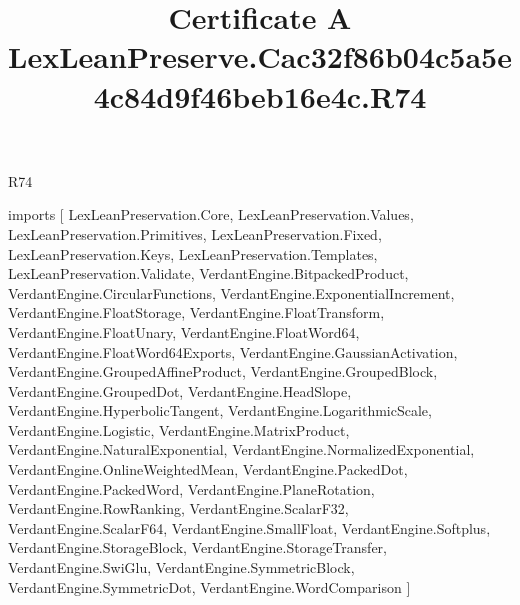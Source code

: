 \begin{lexlean}{R74}
\title{Certificate A LexLeanPreserve.Cac32f86b04c5a5e4c84d9f46beb16e4c.R74}
\begin{coremodule}
imports [
  LexLeanPreservation.Core,
  LexLeanPreservation.Values,
  LexLeanPreservation.Primitives,
  LexLeanPreservation.Fixed,
  LexLeanPreservation.Keys,
  LexLeanPreservation.Templates,
  LexLeanPreservation.Validate,
  VerdantEngine.BitpackedProduct,
  VerdantEngine.CircularFunctions,
  VerdantEngine.ExponentialIncrement,
  VerdantEngine.FloatStorage,
  VerdantEngine.FloatTransform,
  VerdantEngine.FloatUnary,
  VerdantEngine.FloatWord64,
  VerdantEngine.FloatWord64Exports,
  VerdantEngine.GaussianActivation,
  VerdantEngine.GroupedAffineProduct,
  VerdantEngine.GroupedBlock,
  VerdantEngine.GroupedDot,
  VerdantEngine.HeadSlope,
  VerdantEngine.HyperbolicTangent,
  VerdantEngine.LogarithmicScale,
  VerdantEngine.Logistic,
  VerdantEngine.MatrixProduct,
  VerdantEngine.NaturalExponential,
  VerdantEngine.NormalizedExponential,
  VerdantEngine.OnlineWeightedMean,
  VerdantEngine.PackedDot,
  VerdantEngine.PackedWord,
  VerdantEngine.PlaneRotation,
  VerdantEngine.RowRanking,
  VerdantEngine.ScalarF32,
  VerdantEngine.ScalarF64,
  VerdantEngine.SmallFloat,
  VerdantEngine.Softplus,
  VerdantEngine.StorageBlock,
  VerdantEngine.StorageTransfer,
  VerdantEngine.SwiGlu,
  VerdantEngine.SymmetricBlock,
  VerdantEngine.SymmetricDot,
  VerdantEngine.WordComparison
]


\end{coremodule}
\end{lexlean}
